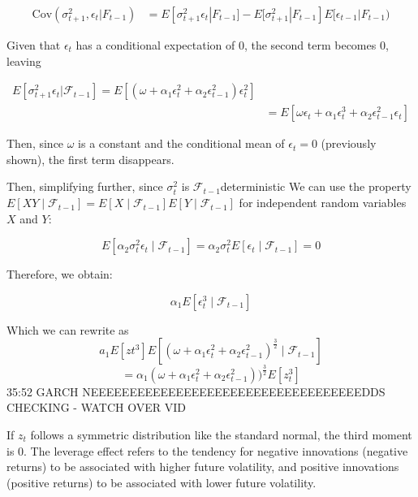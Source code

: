\documentclass{article}
\begin{document}
\begin{align*}
\text{Cov}(\sigma^2_{t+1}, \epsilon_t | F_{t-1}) &= E[ \sigma^2_{t+1} \epsilon_t | F_{t-1}] - E[\sigma^2_{t+1}| F_{t-1} ] E[\epsilon_{t-1} | F_{t-1})
\end{align*}

Given that $\epsilon_t$ has a conditional expectation of 0, the second term becomes 0, leaving

\begin{align*}
E[ \sigma^2_{t+1} \epsilon_t | \ensuremath{\mathcal{F}}_{t-1}] = E \left[ \left( \omega + \alpha_1 \epsilon_t^2 + \alpha_2 \epsilon^2_{t-1} \right) \epsilon_t^2 \right] \\
&= E \left[  \omega \epsilon_t + \alpha_1 \epsilon_t^3 + \alpha_2 \epsilon^2_{t-1}  \epsilon_t  \right]
\end{align*}

Then,  since $\omega$ is a constant and the conditional mean of $\epsilon_t =0$ (previously shown), the first term disappears. 

Then, simplifying further, since $\sigma^2_{t}$ is $\ensuremath{\mathcal{F}}_{t-1}$deterministic 
We can use the property $E[XY \mid \mathcal{F}_{t-1}] = E[X \mid \mathcal{F}_{t-1}]E[Y \mid \mathcal{F}_{t-1}]$ for independent random variables $X$ and $Y$:

\begin{equation}
E[\alpha_2 \sigma_t^2 \epsilon_t \mid \mathcal{F}_{t-1}] = \alpha_2 \sigma_t^2 E[\epsilon_t \mid \mathcal{F}_{t-1}] = 0
\end{equation}

Therefore, we obtain:

\begin{equation}
\alpha_1 E[\epsilon_t^3 \mid \mathcal{F}_{t-1}]
\end{equation}

Which we can rewrite as
 \[
 a_1 E \left[ zt^3 \right] E \left[ ( \omega + \alpha_1 \epsilon_t^2 + \alpha_2 \epsilon^2_{t-1} )^\frac{3}{2} \mid \ensuremath{\mathcal{F}}_{t-1}  \right] 
 \] 
 \[
 = \alpha_1 \left( \omega + \alpha_1 \epsilon_t^2 + \alpha_2 \epsilon^2_{t-1} \right) )^{\frac{3}{2}} E \left[ z_{t}^3 \right]  
 \] 
35:52 GARCH
NEEEEEEEEEEEEEEEEEEEEEEEEEEEEEEEEEEEDDS CHECKING - WATCH OVER VID

If $z_t$ follows a symmetric distribution like the standard normal, the third moment is 0. 
The leverage effect refers to the tendency for negative innovations (negative returns) to be associated with higher future volatility, and positive innovations (positive returns) to be associated with lower future volatility.
\end{document}
